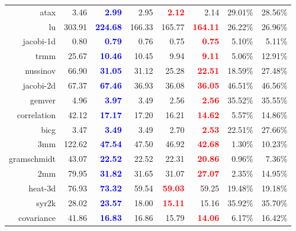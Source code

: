 \documentclass[landscape]{report}
\begin{document}
\begin{longtable}{rrrrrrrr}
atax	& 3.46	& \textcolor{blue}{\textbf{2.99}}	& 2.95	& \textcolor{red}{\textbf{2.12}}	& 2.14	& 29.01\%	& 28.56\% \\
lu	& 303.91	& \textcolor{blue}{\textbf{224.68}}	& 166.33	& 165.77	& \textcolor{red}{\textbf{164.11}}	& 26.22\%	& 26.96\% \\
jacobi-1d	& 0.80	& \textcolor{blue}{\textbf{0.79}}	& 0.76	& 0.75	& \textcolor{red}{\textbf{0.75}}	& 5.10\%	& 5.11\% \\
trmm	& 25.67	& \textcolor{blue}{\textbf{10.46}}	& 10.45	& 9.94	& \textcolor{red}{\textbf{9.11}}	& 5.06\%	& 12.91\% \\
nussinov	& 66.90	& \textcolor{blue}{\textbf{31.05}}	& 31.12	& 25.28	& \textcolor{red}{\textbf{22.51}}	& 18.59\%	& 27.48\% \\
jacobi-2d	& 67.37	& \textcolor{blue}{\textbf{67.46}}	& 36.93	& 36.08	& \textcolor{red}{\textbf{36.05}}	& 46.51\%	& 46.56\% \\
gemver	& 4.96	& \textcolor{blue}{\textbf{3.97}}	& 3.49	& 2.56	& \textcolor{red}{\textbf{2.56}}	& 35.52\%	& 35.55\% \\
correlation	& 42.12	& \textcolor{blue}{\textbf{17.17}}	& 17.20	& 16.21	& \textcolor{red}{\textbf{14.62}}	& 5.57\%	& 14.86\% \\
bicg	& 3.47	& \textcolor{blue}{\textbf{3.49}}	& 3.49	& 2.70	& \textcolor{red}{\textbf{2.53}}	& 22.51\%	& 27.66\% \\
3mm	& 122.62	& \textcolor{blue}{\textbf{47.54}}	& 47.50	& 46.92	& \textcolor{red}{\textbf{42.68}}	& 1.30\%	& 10.23\% \\
gramschmidt	& 43.07	& \textcolor{blue}{\textbf{22.52}}	& 22.52	& 22.31	& \textcolor{red}{\textbf{20.86}}	& 0.96\%	& 7.36\% \\
2mm	& 79.95	& \textcolor{blue}{\textbf{31.82}}	& 31.65	& 31.07	& \textcolor{red}{\textbf{27.07}}	& 2.35\%	& 14.95\% \\
heat-3d	& 76.93	& \textcolor{blue}{\textbf{73.32}}	& 59.54	& \textcolor{red}{\textbf{59.03}}	& 59.25	& 19.48\%	& 19.18\% \\
syr2k	& 28.02	& \textcolor{blue}{\textbf{23.57}}	& 18.00	& \textcolor{red}{\textbf{15.11}}	& 15.16	& 35.92\%	& 35.70\% \\
covariance	& 41.86	& \textcolor{blue}{\textbf{16.83}}	& 16.86	& 15.79	& \textcolor{red}{\textbf{14.06}}	& 6.17\%	& 16.42\% \\
\bottomrule
\end{longtable}
\end{document}

